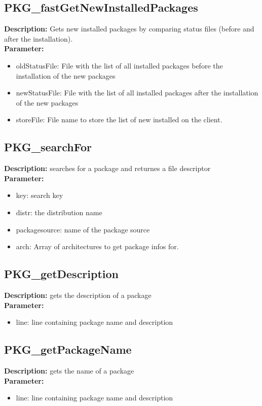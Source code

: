 \subsection{PKG\_fastGetNewInstalledPackages}
\textbf{Description:} Gets new installed packages by comparing status files (before and after the installation).\\
\textbf{Parameter:}
\begin{itemize}
\item oldStatusFile: File with the list of all installed packages before the installation of the new packages
\item newStatusFile: File with the list of all installed packages after the installation of the new packages
\item storeFile: File name to store the list of new installed on the client.
\end{itemize}

\subsection{PKG\_searchFor}
\textbf{Description:} searches for a package and returnes a file descriptor\\
\textbf{Parameter:}
\begin{itemize}
\item key: search key
\item distr: the distribution name
\item packagesource: name of the package source
\item arch: Array of architectures to get package infos for.
\end{itemize}

\subsection{PKG\_getDescription}
\textbf{Description:} gets the description of a package\\
\textbf{Parameter:}
\begin{itemize}
\item line: line containing package name and description
\end{itemize}

\subsection{PKG\_getPackageName}
\textbf{Description:} gets the name of a package\\
\textbf{Parameter:}
\begin{itemize}
\item line: line containing package name and description
\end{itemize}

